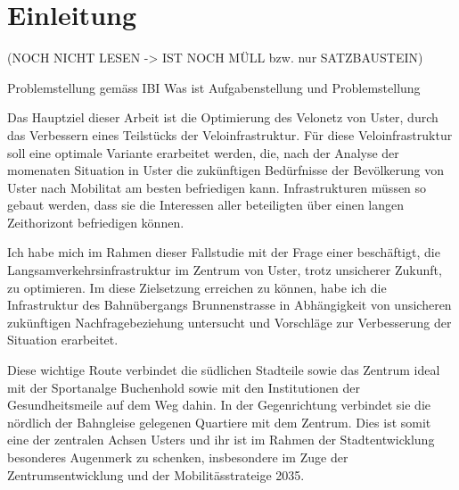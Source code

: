 %
%            
%
%
%

\chapter{Einleitung}
\label{chap:Einleitung}

(NOCH NICHT LESEN -> IST NOCH MÜLL bzw. nur SATZBAUSTEIN)

Problemstellung gemäss IBI
Was ist Aufgabenstellung und Problemstellung

Das Hauptziel dieser Arbeit ist die Optimierung des Velonetz von Uster, durch das Verbessern eines Teilstücks der Veloinfrastruktur. Für diese Veloinfrastruktur soll eine optimale Variante erarbeitet werden, die, nach der Analyse der momenaten Situation in Uster die zukünftigen Bedürfnisse der Bevölkerung von Uster nach Mobilitat am besten befriedigen kann. Infrastrukturen müssen so gebaut werden, dass sie die Interessen aller beteiligten über einen langen Zeithorizont befriedigen können.

Ich habe mich im Rahmen dieser Fallstudie mit der Frage einer beschäftigt, die Langsamverkehrsinfrastruktur im Zentrum von Uster, trotz unsicherer Zukunft, zu optimieren. Im diese Zielsetzung erreichen zu können, habe ich die Infrastruktur des Bahnübergangs Brunnenstrasse in Abhängigkeit von unsicheren zukünftigen Nachfragebeziehung untersucht und Vorschläge zur Verbesserung der Situation erarbeitet.

Diese wichtige Route verbindet die südlichen Stadteile sowie das Zentrum ideal mit der Sportanalge Buchenhold sowie mit den Institutionen der Gesundheitsmeile auf dem Weg dahin. In der Gegenrichtung verbindet sie die nördlich der Bahngleise gelegenen Quartiere mit dem Zentrum. Dies ist somit eine der zentralen Achsen Usters und ihr ist im Rahmen der Stadtentwicklung besonderes Augenmerk zu schenken, insbesondere im Zuge der Zentrumsentwicklung und der Mobilitässtrateige 2035. 

